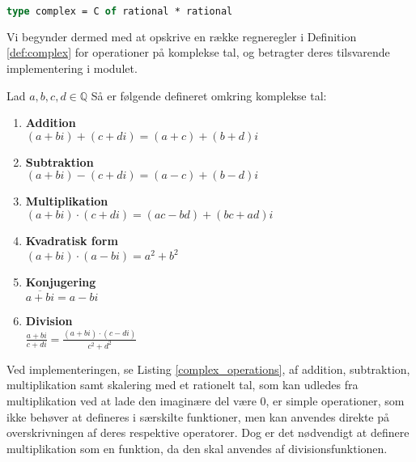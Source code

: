 \documentclass{article}
\begin{document}
\begin{lstlisting}[language={FSharp}, 
    label={type_complex},
    caption={Typen for komplekse tal}]
type complex = C of rational * rational
\end{lstlisting}

Vi begynder dermed med at opskrive en række regneregler i Definition \ref{def:complex} for operationer på komplekse tal, og betragter deres tilsvarende implementering i modulet. 
\vspace{0.5cm}
\begin{definition}\label{def:complex}
  Lad $a, b, c, d \in \mathbb{Q}$ Så er følgende defineret omkring komplekse tal:
  \begin{enumerate}
    \item \textbf{Addition} \\ $(a + bi) + (c + di) = (a + c) + (b + d)i$
    \item \textbf{Subtraktion} \\ $(a + bi) - (c + di) = (a - c) + (b - d)i$
    \item \textbf{Multiplikation} \\ $(a + bi) \cdot (c + di) = (ac - bd) + (bc + ad)i$
    \item \textbf{Kvadratisk form} \\ $ (a + bi) \cdot (a - bi) = a^2 + b^2$
    \item \textbf{Konjugering} \\ $\overline{a + bi} = a - bi$
    \item \textbf{Division} \\ $\frac{a + bi}{c + di} = \frac{(a + bi)\cdot(c - di)}{c^2 + d^2}$
  \end{enumerate}
\end{definition}

Ved implementeringen, se Listing \ref{complex_operations}, af addition, subtraktion, multiplikation samt skalering med et rationelt tal, som kan udledes fra multiplikation ved at lade den imaginære del være $0$, er simple operationer, som ikke behøver at defineres i særskilte funktioner, men kan anvendes direkte på overskrivningen af deres respektive operatorer. Dog er det nødvendigt at definere multiplikation som en funktion, da den skal anvendes af divisionsfunktionen. 
\end{document}

